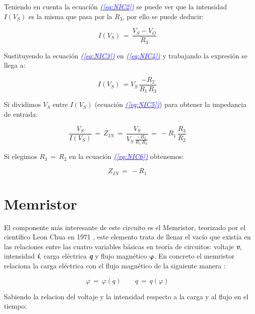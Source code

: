 \documentclass[12pt,a4paper]{report} %
\newcommand{\eref}[1]{\hyperref[#1]{\textcolor{blue}{\textit{(\ref*{#1})}}}}
\begin{document}
	Teniendo en cuenta la ecuación \eref{eq:NIC2} se puede ver que la intensidad $I(V_S)$ es la misma que pasa por la $R_3$, por ello se puede deducir:
	
	\begin{equation}
		I(V_S)\,=\,\frac{V_S - V_O}{R_3}
		\label{eq:NIC4}
	\end{equation}\smallskip
	
	Sustituyendo la ecuación \eref{eq:NIC3} en \eref{eq:NIC4} y trabajando la expresión se llega a:
	
	\begin{equation}
		I(V_S)\,=V_S\,\frac{-R_2}{R_1 \, R_3}
		\label{eq:NIC5}
	\end{equation}\smallskip
	
	Si dividimos $V_S$ entre $I(V_S)$ (ecuación \eref{eq:NIC5}) para obtener la impedancia de entrada:
	
	\begin{equation}
		\frac{V_S}{I(V_S)}\,=\,Z_{IN}\,=\,\frac{V_S}{V_S\,\frac{-R_2}{R_1 \, R_3}}\,=\,-R_1\,\frac{R_3}{R_2}
		\label{eq:NIC6}
	\end{equation}\smallskip
	
	Si elegimos $R_3\,=\,R_2$ en la ecuación \eref{eq:NIC6} obtenemos:
	
	\begin{equation}
		Z_{IN}\,=\,-R_1
		\label{eq:NIC7}
	\end{equation}\smallskip
	
	\newpage
	\section{Memristor}
	El componente más interesante de este circuito es el Memristor, teorizado por el científico Leon Chua en 1971 \cite{chuamissing1971}, este elemento trata de llenar el vacío que existía en las relaciones entre las cuatro variables básicas en teoría de circuitos: voltaje \textbf{\textit{v}}, intensidad \textbf{\textit{i}}, carga eléctrica \textbf{\textit{q}} y flujo magnético \textit{$\bm{\varphi}$}. En concreto el memristor relaciona la carga eléctrica con el flujo magnético de la siguiente manera \cite{chuaoscillator2008}:
	
	\begin{equation}
		\varphi\,=\,\varphi(q) \qquad q\,=\,q(\varphi)
		\label{eq:flujocarga}
	\end{equation}\smallskip
	
	Sabiendo la relacion del voltaje y la intensidad respecto a la carga y al flujo en el tiempo:
\end{document}
